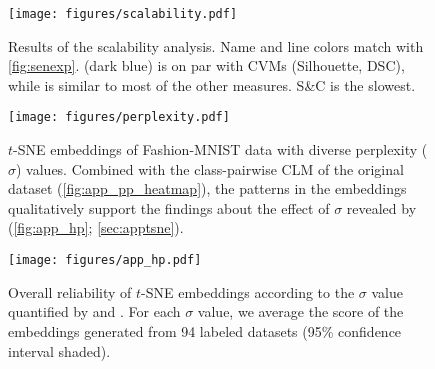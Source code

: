 






\begin{figure}[t]
    \centering
    \texttt{[image: figures/scalability.pdf]}
    \vspace{-8.5mm}
    \caption{Results of the scalability analysis. Name and line colors match with \autoref{fig:senexp}. \ltc [DSC] (dark blue) is on par with CVMs (Silhouette, DSC), while \ltc [\CHb] is similar to most of the other measures. S\&C is the slowest. \vspace{-4mm}}
    \label{fig:scal}
\end{figure}



\begin{figure*}[t]
    \centering
    \texttt{[image: figures/perplexity.pdf]} \vspace{-6mm}
    \caption{$t$-SNE embeddings of Fashion-MNIST \cite{xiao2017arxiv} data with diverse perplexity ($\sigma$) values. Combined with the class-pairwise CLM of the original dataset (\autoref{fig:app_pp_heatmap}), the patterns in the embeddings qualitatively support the findings about the effect of $\sigma$ revealed by \ltc (\autoref{fig:app_hp}; \autoref{sec:apptsne}). \vspace{-2mm}}
    \label{fig:app_pp}
\end{figure*}


\begin{figure}[t]
    \centering
    \texttt{[image: figures/app\_hp.pdf]} \vspace{-6mm}
    \caption{Overall reliability of $t$-SNE embeddings according to the $\sigma$ value quantified by \ltc [DSC] and \ltc [\CHb{}]. For each $\sigma$ value, we average the score of the embeddings generated from 94 labeled datasets (95\% confidence interval shaded).  \vspace{-2mm}}
    \label{fig:app_hp}
\end{figure}



